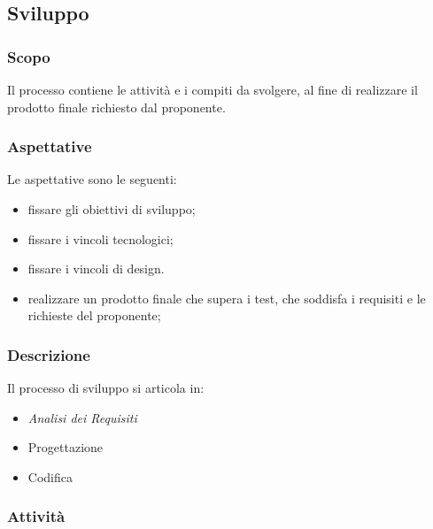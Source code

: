 \subsection{Sviluppo}
	\subsubsection{Scopo}
	Il processo contiene le attività e i compiti da svolgere, al fine di realizzare il prodotto finale richiesto dal proponente.
	\subsubsection{Aspettative}
	Le aspettative sono le seguenti:
	\begin{itemize}
		\item fissare gli obiettivi di sviluppo;
		\item fissare i vincoli tecnologici;
		\item fissare i vincoli di design.
		\item realizzare un prodotto finale che supera i test, che soddisfa i requisiti e le richieste del proponente;
	\end{itemize}
	\subsubsection{Descrizione}
	Il processo di sviluppo si articola in:
	\begin{itemize}
		\item \textit{Analisi dei Requisiti}
		\item Progettazione
		\item Codifica	
	\end{itemize}
	\subsubsection{Attività}
